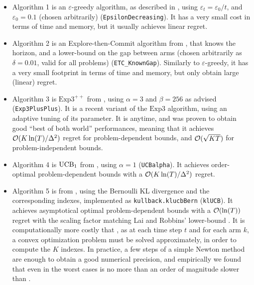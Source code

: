 
\begin{itemize}
    \item Algorithm 1 is
    an $\varepsilon$-greedy algorithm, as described in \cite{Bubeck12}, using $\varepsilon_t = \varepsilon_0 / t$, and $\varepsilon_0 = 0.1$ (chosen arbitrarily) (\texttt{EpsilonDecreasing}).
    It has a very small cost in terms of time and memory, but it usually achieves linear regret.

    \item Algorithm 2 is
    an Explore-then-Commit algorithm from \cite{GarivierETC2016}, that knows the horizon, and a lower-bound on the gap between arms (chosen arbitrarily as $\delta=0.01$, valid for all problems) (\texttt{ETC\_KnownGap}).
    Similarly to $\varepsilon$-greedy, it has a very small footprint in terms of time and memory, but only obtain large (linear) regret.

    \item Algorithm 3 is
    $\mathrm{Exp}3^{++}$ from \cite{Seldin17}, using $\alpha=3$ and $\beta=256$ as advised (\texttt{Exp3PlusPlus}).
    It is a recent variant of the $\mathrm{Exp3}$ algorithm, using an adaptive tuning of its parameter. It is anytime, and was proven to obtain good ``best of both world'' performances, meaning that it achieves $\mathcal{O}(K\ln(T)/\Delta^2)$ regret for problem-dependent bounds, and $\mathcal{O}(\sqrt{KT})$ for problem-independent bounds.

    \item Algorithm 4 is
    $\mathrm{UCB}_1$ from \cite{Auer02}, using $\alpha=1$ (\texttt{UCBalpha}).
    It achieves order-optimal problem-dependent bounds with a $\mathcal{O}(K\ln(T)/\Delta^2)$ regret.

    \item Algorithm 5 is
    \klUCB{} from \cite{KLUCBJournal}, using the Bernoulli KL divergence and the corresponding \klUCB{} indexes, implemented as \texttt{kullback.klucbBern} (\texttt{klUCB}).
    It achieves asymptotical optimal problem-dependent bounds with a $\mathcal{O}(\ln(T))$ regret with the scaling factor matching Lai and Robbins' lower-bound \cite{LaiRobbins85}.
    It is computationally more costly that \UCB, as at each time step $t$ and for each arm $k$, a convex optimization problem must be solved approximately, in order to compute the $K$ indexes.
    In practice, a few steps of a simple Newton method are enough to obtain a good numerical precision, and empirically we found that even in the worst cases \klUCB{} is no more than an order of magnitude slower than \UCB.


\end{itemize}
